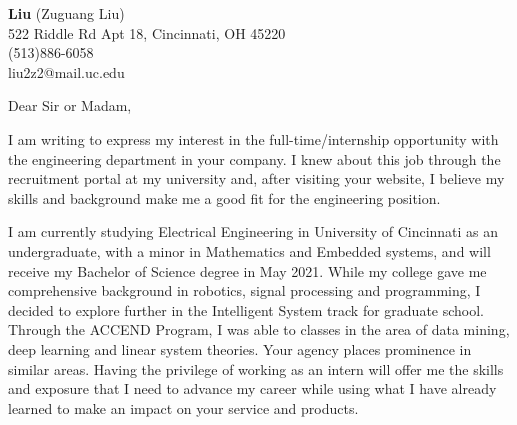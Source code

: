 \documentclass[11pt]{letter} %
\begin{document}

\begin{letter}
{\vspace{-15pt}} 


\begin{center}
\large \textbf{Liu} (Zuguang Liu) \\ %
522 Riddle Rd Apt 18, Cincinnati, OH 45220 \\ (513)886-6058  \\ liu2z2@mail.uc.edu%
\end{center} 


\signature{Liu (Zuguang Liu)} %


\opening{Dear Sir or Madam,} 
 
I am writing to express my interest in the full-time/internship opportunity with the engineering department in your company. I knew about this job through the recruitment portal at my university and, after visiting your website, I believe my skills and background make me a good fit for the engineering position.  

I am currently studying Electrical Engineering in University of Cincinnati as an undergraduate, with a minor in Mathematics and Embedded systems, and will receive my Bachelor of Science degree in May 2021. While my college gave me comprehensive background in robotics, signal processing and programming, I decided to explore further in the Intelligent System track for graduate school. Through the ACCEND Program, I was able to classes in the area of data mining, deep learning and linear system theories. Your agency places prominence in similar areas. Having the privilege of working as an intern will offer me the skills and exposure that I need to advance my career while using what I have already learned to make an impact on your service and products. 


\end{letter}
\end{document}
